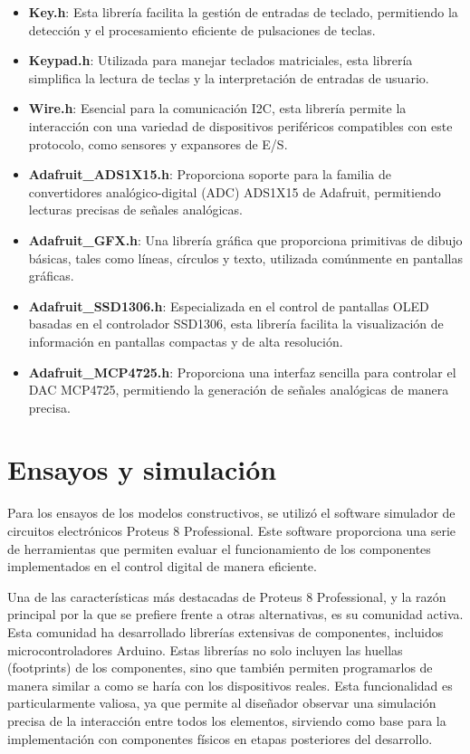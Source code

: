\begin{itemize}
    \item \textbf{Key.h}: Esta librería facilita la gestión de entradas de teclado, permitiendo la detección y el procesamiento eficiente de pulsaciones de teclas.
    \item \textbf{Keypad.h}: Utilizada para manejar teclados matriciales, esta librería simplifica la lectura de teclas y la interpretación de entradas de usuario.
    \item \textbf{Wire.h}: Esencial para la comunicación I2C, esta librería permite la interacción con una variedad de dispositivos periféricos compatibles con este protocolo, como sensores y expansores de E/S.
    \item \textbf{Adafruit\_ADS1X15.h}: Proporciona soporte para la familia de convertidores analógico-digital (ADC) ADS1X15 de Adafruit, permitiendo lecturas precisas de señales analógicas.
    \item \textbf{Adafruit\_GFX.h}: Una librería gráfica que proporciona primitivas de dibujo básicas, tales como líneas, círculos y texto, utilizada comúnmente en pantallas gráficas.
    \item \textbf{Adafruit\_SSD1306.h}: Especializada en el control de pantallas OLED basadas en el controlador SSD1306, esta librería facilita la visualización de información en pantallas compactas y de alta resolución.
    \item \textbf{Adafruit\_MCP4725.h}: Proporciona una interfaz sencilla para controlar el DAC MCP4725, permitiendo la generación de señales analógicas de manera precisa.
\end{itemize}

\section{Ensayos y simulación}
Para los ensayos de los modelos constructivos, se utilizó el software simulador de circuitos electrónicos Proteus 8 Professional. Este software proporciona una serie de herramientas que permiten evaluar el funcionamiento de los componentes implementados en el control digital de manera eficiente. \par 
Una de las características más destacadas de Proteus 8 Professional, y la razón principal por la que se prefiere frente a otras alternativas, es su comunidad activa. Esta comunidad ha desarrollado librerías extensivas de componentes, incluidos microcontroladores Arduino. Estas librerías no solo incluyen las huellas (footprints) de los componentes, sino que también permiten programarlos de manera similar a como se haría con los dispositivos reales. Esta funcionalidad es particularmente valiosa, ya que permite al diseñador observar una simulación precisa de la interacción entre todos los elementos, sirviendo como base para la implementación con componentes físicos en etapas posteriores del desarrollo.

